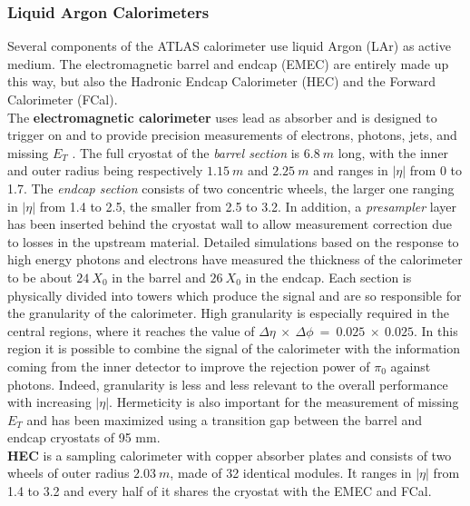 \documentclass[a4paper,twoside,12pt]{article}
\begin{document}
\subsubsection*{Liquid Argon Calorimeters}\label{sec:LAr}
Several components of the ATLAS calorimeter use liquid Argon (LAr) as active medium\cite{current_EMCal}. The electromagnetic barrel and endcap (EMEC) are entirely made up this way, but also the Hadronic Endcap Calorimeter (HEC) and the Forward Calorimeter (FCal). \\[2pt]
The \textbf{electromagnetic calorimeter} uses lead as absorber and is designed to trigger on and to provide precision measurements of electrons, photons, jets, and missing $E_T$ .
The full cryostat of the \textit{barrel section} is $6.8\ m$ long, with the inner and outer radius being respectively $1.15\ m$ and $2.25\ m$ and ranges in $|\eta|$ from 0 to 1.7.  The \textit{endcap section} consists of two concentric wheels, the larger one ranging in $|\eta|$ from 1.4 to 2.5, the smaller from 2.5 to 3.2. In addition, a \textit{presampler} layer has been inserted behind the cryostat wall to allow measurement correction due to losses in the upstream material. 
Detailed simulations based on the response to high energy photons and electrons have
measured the thickness of the calorimeter to be about $24\ X_0$ in the barrel and $26\ X_0$ in the endcap. Each section is physically divided into towers which produce the signal and are so responsible
for the granularity of the calorimeter.
High granularity is especially required in the central regions, where it reaches the value of 
$\Delta\eta\ \times\ \Delta\phi\ =\ 0.025\ \times\ 0.025$. In this region it is possible to combine the signal of the calorimeter with the information coming from the inner detector to improve the rejection power of $\pi_0$ against photons. Indeed, granularity is less and less relevant to the overall performance with increasing $|\eta|$. Hermeticity is also important for the measurement of missing $E_T$ and has been maximized using a transition gap between the barrel and endcap cryostats of 95 mm. \\

\textbf{HEC}\cite{hec} is a sampling calorimeter with copper absorber plates and consists of two wheels of outer radius $2.03\ m$, made of 32 identical modules. It ranges in $|\eta|$ from 1.4 to 3.2 and every half of it shares the cryostat with the EMEC and FCal. \\[2pt]
\end{document}

